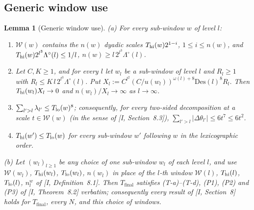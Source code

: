 \documentclass[10pt]{amsart}
\newtheorem{lemma}[theorem]{Lemma}
\theoremstyle{definition}
\theoremstyle{remark}
\begin{document}
\subsection{Generic window use}

\begin{lemma}[Generic window use]\label{lem:II-GW}
\textup{(a)} For every sub-window $w$ of level $l$:
\begin{enumerate}
\item[(GW1)] $\mathcal W(w)$ contains the $n(w)$ dyadic scales
$T_{\rm hi}(w)2^{1-i}$, $1\le i\le n(w)$, and
$T_{\rm hi}(w)2^{l^3}\Lambda^\circ(l)\le1/l$,
$n(w)\ge l\,2^{l^3}\Lambda^\circ(l)$.
\item[(GW2)] Let $C,K\ge1$, and for every $l$ let $w_l$ be a sub-window of
level $l$ and $R_l\ge1$ with $R_l\le K\,l\,2^{l^3}\Lambda^\circ(l)$.  Put
$X_l:=C^{l^2}(C/u(w_l))^{\omega(l)+8}\mathrm{Des}(l)^8R_l$.  Then
$T_{\rm hi}(w_l)X_l\to0$ and $n(w_l)/X_l\to\infty$ as $l\to\infty$.
\item[(GW3)] $\sum_{l'>l}\lambda_{l'}\le T_{\rm lo}(w)^8$; consequently, for
every two-sided decomposition at a scale $t\in\mathcal W(w)$ (in the
sense of [I, Section~8.3]), $\sum_{l'>l}|\Delta\theta_{l'}|\le
6t^7\le6t^2$.
\item[(GW4)] $T_{\rm hi}(w')\le T_{\rm lo}(w)$ for every sub-window $w'$
following $w$ in the lexicographic order.
\end{enumerate}
\textup{(b)} Let $(w_l)_{l\ge1}$ be any choice of one sub-window $w_l$ of
each level $l$, and use $\mathcal W(w_l)$, $T_{\rm hi}(w_l)$,
$T_{\rm lo}(w_l)$, $n(w_l)$ in place of the $l$-th window $\mathcal W(l)$,
$T_{\rm hi}(l)$, $T_{\rm lo}(l)$, $n^w_l$ of [I, Definition~8.1].
Then $T_{\mathrm{final}}$ satisfies (T-a)--(T-d), (P1), (P2) and (P3) of
[I, Theorem~8.2] verbatim; consequently every result of
[I, Section~8] holds for $T_{\mathrm{final}}$, every $N$, and this
choice of windows.
\end{lemma}
\end{document}
